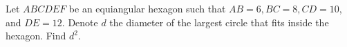 Let $ABCDEF$ be an equiangular hexagon such that $AB=6, BC=8, CD=10$,  and $DE=12$. Denote $d$ the diameter of the largest circle that fits inside the hexagon. Find $d^2$.